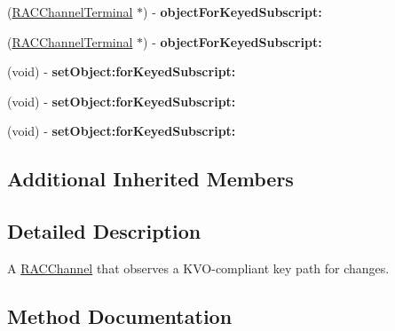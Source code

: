 \begin{DoxyCompactItemize}
(\mbox{\hyperlink{interface_r_a_c_channel_terminal}{R\+A\+C\+Channel\+Terminal}} $\ast$) -\/ {\bfseries object\+For\+Keyed\+Subscript\+:}
\item 
\mbox{\label{interface_r_a_c_k_v_o_channel_a7d637c08acb87250b575eecde893c6cd}} 
(\mbox{\hyperlink{interface_r_a_c_channel_terminal}{R\+A\+C\+Channel\+Terminal}} $\ast$) -\/ {\bfseries object\+For\+Keyed\+Subscript\+:}
\item 
\mbox{\label{interface_r_a_c_k_v_o_channel_ae25f6ce87df9e7f9836e3b013fa22cc0}} 
(void) -\/ {\bfseries set\+Object\+:for\+Keyed\+Subscript\+:}
\item 
\mbox{\label{interface_r_a_c_k_v_o_channel_ae25f6ce87df9e7f9836e3b013fa22cc0}} 
(void) -\/ {\bfseries set\+Object\+:for\+Keyed\+Subscript\+:}
\item 
\mbox{\label{interface_r_a_c_k_v_o_channel_ae25f6ce87df9e7f9836e3b013fa22cc0}} 
(void) -\/ {\bfseries set\+Object\+:for\+Keyed\+Subscript\+:}
\end{DoxyCompactItemize}
\subsection*{Additional Inherited Members}


\subsection{Detailed Description}
A \mbox{\hyperlink{interface_r_a_c_channel}{R\+A\+C\+Channel}} that observes a K\+V\+O-\/compliant key path for changes. 

\subsection{Method Documentation}
\mbox{\label{interface_r_a_c_k_v_o_channel_a4a6f2925587bdcaf90419bae2da284a4}} 
